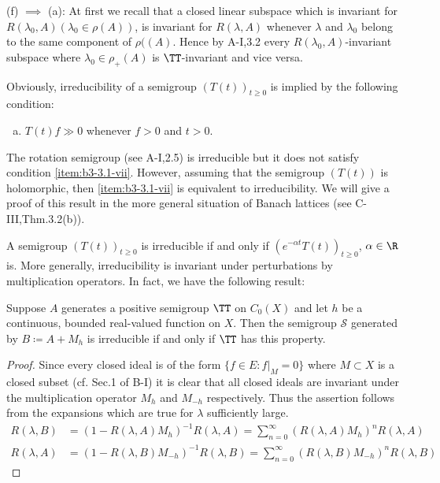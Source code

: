 (f) $\implies$ (a): At first we recall that a closed linear subspace which is invariant for $R(\lambda_0,A)  (\lambda_0 \in \rho(A))$, is invariant for $R(\lambda ,A)$
whenever $\lambda$ and $\lambda_0$ belong to the same component of $\rho((A)$. 
Hence by A-I,3.2 every $R(\lambda_0,A)$-invariant subspace where $\lambda_0 \in \rho_{+}(A)$ is 
$\TT$-invariant and vice versa.
\begin{remark}\label{rem:b3-3.2}
	Obviously, irreducibility of a semigroup $(T(t))_{t\geq 0}$ is implied by the following condition:

\begin{enumerate}[(a), resume]	
\item\label{item:b3-3.1-vii}
$T(t)f \gg 0$ whenever $f > 0$ and $t > 0$.
\end{enumerate}
The rotation semigroup (see A-I,2.5) is irreducible but it does not satisfy condition \ref{item:b3-3.1-vii}.
	However, assuming that the semigroup $(T(t))$ is holomorphic, then \ref{item:b3-3.1-vii}
	is equivalent to irreducibility.
	We will give a proof of this result in the more general situation of Banach lattices (see C-III,Thm.3.2(b)).
\end{remark}
A semigroup $(T(t))_{t \ge 0}$ is irreducible if and only if $(e^{-\alpha t}T(t))_{t \ge 0}$, 
$\alpha \in \R$  is. More generally, irreducibility is invariant under pertur­bations by multiplication operators. In fact, we have the following result: 
\begin{proposition}\label{prop:b3-3.3}
	Suppose $A$ generates a positive semigroup $\TT$ on $C_{0}(X)$ and let $h$ be a continuous, bounded real-valued function on $X$.
	Then the semigroup $\mathcal{S}$ generated by $B \coloneqq A + M_{h}$ is irreducible if and only if\/ $\TT$ has this property.
\end{proposition}
%
%
\begin{proof}
	Since every closed ideal is of the form $\{f \in E : f|_{M} = 0\}$ where $M \subset X$ is a closed subset (cf. Sec.1 of B-I) it is clear that all closed ideals are invariant under the multiplication operator $M_{h}$ and $M_{-h}$ respectively.
	Thus the assertion follows from the expansions which are true for $\lambda$ sufficiently large.
\begin{align*}
R(\lambda,B) &= (1 - R(\lambda,A)M_{h})^{-1}R(\lambda,A) 
	= \sum_{n=0}^{\infty} (R(\lambda,A)M_{h})^{n}R(\lambda,A) \\
R(\lambda,A) &= (1 - R(\lambda,B)M_{-h})^{-1}R(\lambda,B) = \sum_{n=0}^{\infty} (R(\lambda,B)M_{-h})^{n}R(\lambda,B)
\end{align*} 
\end{proof}

